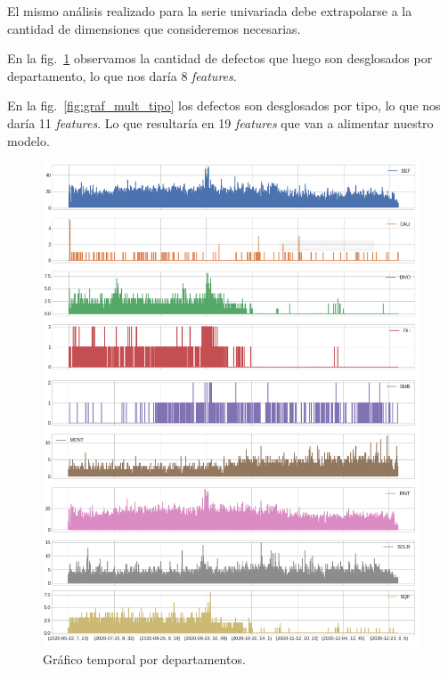 \documentclass[a4paper,12pt]{article}
\begin{document}
		El mismo análisis realizado para la serie univariada debe extrapolarse a la cantidad de dimensiones que consideremos necesarias. 
						
		En la fig.~\ref{fig:graf_mult_dpto} observamos la cantidad de defectos que luego son desglosados por departamento, lo que nos daría 8 \textit{features}. 
				
		En la fig.~\ref{fig:graf_mult_tipo} los defectos son desglosados por tipo, lo que nos daría 11 \textit{features}. Lo que resultaría en 19 \textit{features} que van a alimentar nuestro modelo.
						
		\begin{figure}[H]
			\begin{center}
				\includegraphics[width=1\textwidth]{multi_dpto.png}
				\caption{Gráfico temporal por departamentos.}
				\label{fig:graf_mult_dpto}
			\end{center}
		\end{figure}
						
\end{document}
